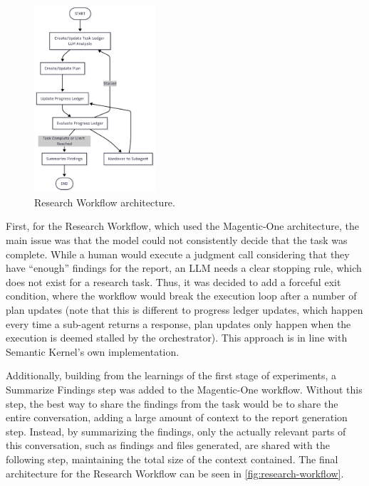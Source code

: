\documentclass[a4paper]{report}
\begin{document}
\begin{figure}[h]
\centering
\includegraphics[width=0.4\textwidth]{images/research-workflow.png}
\caption{Research Workflow architecture.}
\label{fig:research-workflow}
\end{figure}

First, for the Research Workflow, which used the Magentic-One architecture, the main issue was that the model could not consistently decide that the task was complete. While a human would execute a judgment call considering that they have ``enough'' findings for the report, an LLM needs a clear stopping rule, which does not exist for a research task. Thus, it was decided to add a forceful exit condition, where the workflow would break the execution loop after a number of plan updates (note that this is different to progress ledger updates, which happen every time a sub-agent returns a response, plan updates only happen when the execution is deemed stalled by the orchestrator). This approach is in line with Semantic Kernel's own implementation.

Additionally, building from the learnings of the first stage of experiments, a Summarize Findings step was added to the Magentic-One workflow. Without this step, the best way to share the findings from the task would be to share the entire conversation, adding a large amount of context to the report generation step. Instead, by summarizing the findings, only the actually relevant parts of this conversation, such as findings and files generated, are shared with the following step, maintaining the total size of the context contained. The final architecture for the Research Workflow can be seen in \autoref{fig:research-workflow}.
\end{document}
